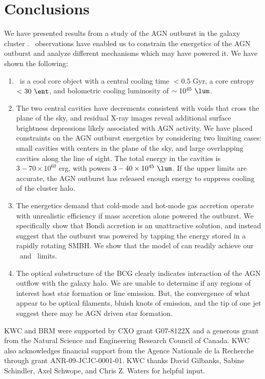 \documentclass[11pt, preprint]{aastex}
\begin{document}
\section{Conclusions}
\label{sec:con}

We have presented results from a study of the AGN outburst in the
galaxy cluster \rbs. \cxo\ observations have enabled us to constrain
the energetics of the AGN outburst and analyze different mechanisms
which may have powered it. We have shown the following:
\begin{enumerate}
\item \rbs\ is a cool core object with a central cooling time $< 0.5$
  Gyr, a core entropy $< 30 ~\ent$, and bolometric cooling luminosity
  of $\sim 10^{45} ~\lum$.
\item The two central cavities have decrements consistent with voids
  that cross the plane of the sky, and residual X-ray images reveal
  additional surface brightness depressions likely associated with AGN
  activity. We have placed constraints on the AGN outburst energetics
  by considering two limiting cases: small cavities with centers in
  the plane of the sky, and large overlapping cavities along the line
  of sight. The total energy in the cavities is $3-70 \times 10^{60}$
  erg, with powers $3-40 \times 10^{45} ~\lum$. If the upper limits
  are accurate, the AGN outburst has released enough energy to
  suppress cooling of the cluster halo.
\item The energetics demand that cold-mode and hot-mode gas accretion
  operate with unrealistic efficiency if mass accretion alone powered
  the outburst. We specifically show that Bondi accretion is an
  unattractive solution, and instead suggest that the outburst was
  powered by tapping the energy stored in a rapidly rotating SMBH. We
  show that the model of \citet{gesspin} can readily achieve our
  \ecav\ and \pcav\ limits.
\item The optical substructure of the BCG clearly indicates
  interaction of the AGN outflow with the galaxy halo. We are unable
  to determine if any regions of interest host star formation or line
  emission. But, the convergence of what appear to be optical
  filaments, bluish knots of emission, and the tip of one jet suggest
  there may be AGN driven star formation.
\end{enumerate}

\acknowledgements

KWC and BRM were supported by CXO grant G07-8122X and a generous grant
from the Natural Science and Engineering Research Council of
Canada. KWC also acknowledges financial support from the Agence
Nationale de la Recherche through grant ANR-09-JCJC-0001-01. KWC
thanks David Gilbanks, Sabine Schindler, Axel Schwope, and Chris
Z. Waters for helpful input.
\end{document}
